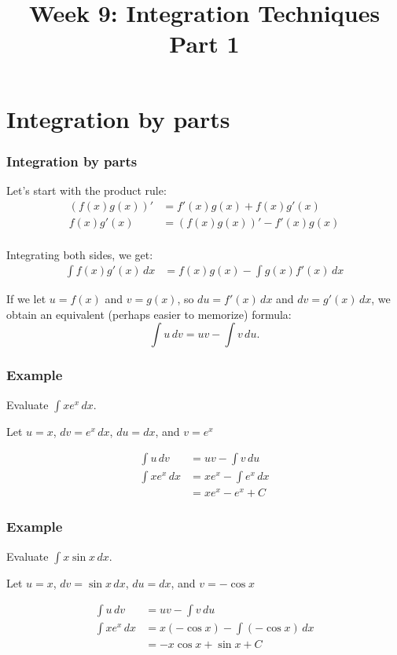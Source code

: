 \documentclass[t]{beamer}
\title{Week 9:  Integration Techniques Part 1}
\theoremstyle{plain}
\theoremstyle{definition}
\begin{document}
\frame{\titlepage}

\setcounter{tocdepth}{2}
\frame{\tableofcontents
}



\section{Integration by parts}

\begin{frame}
\frametitle{Integration by parts}

Let's start with the product rule:
\begin{align*}
(f(x)g(x))' &= f'(x)g(x) + f(x)g'(x)\\
 f(x)g'(x)  & = (f(x)g(x))'  - f'(x)g(x)\\
\end{align*}

\vspace{-1em}

Integrating both sides, we get:
\begin{align*}
\displaystyle\int f(x)g'(x)\,dx &= f(x)g(x) - \int g(x)f'(x)\,dx
\end{align*}

If we let $u = f(x)$ and $v = g(x)$, so $du=f'(x)\,dx$ and $dv = g'(x)\,dx$, we obtain an equivalent (perhaps easier to memorize) formula:
\[\displaystyle\int u\, dv = uv - \int v \, du.\]

\end{frame}

\begin{frame}
\frametitle{Example} 

Evaluate $ \int x e^{x} \, dx.$ \pause

\medskip

Let $u=x$,  $dv = e^x \,dx$,  $du = dx$,  and $v = e^x$

\begin{align*}
\int u\, dv &= uv - \int v \, du \\
\int xe^x \,dx &= xe^x - \int e^x \,dx\\
                       &= xe^x - e^x + C
\end{align*}

\end{frame}

\begin{frame}
\frametitle{Example} 

Evaluate $ \int x \sin{x} \, dx.$ \pause

\medskip

Let $u=x$,  $dv = \sin{x} \,dx$,  $du = dx$,  and $v = -\cos{x}$

\begin{align*}
\int u\, dv &= uv - \int v \, du \\
\int xe^x \,dx &= x(-\cos{x})- \int (-\cos{x}) \,dx\\
                       &= -x\cos{x} + \sin{x} + C
\end{align*}

\end{frame}
\end{document}

